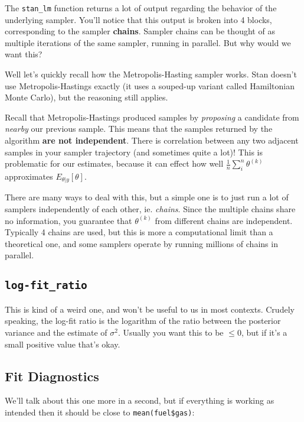 \documentclass[
]{article}
\begin{document}
The \texttt{stan\_lm} function returns a lot of output regarding the
behavior of the underlying sampler. You'll notice that this output is
broken into 4 blocks, corresponding to the sampler \textbf{chains}.
Sampler chains can be thought of as multiple iterations of the same
sampler, running in parallel. But why would we want this?

Well let's quickly recall how the Metropolis-Hasting sampler works. Stan
doesn't use Metropolis-Hastings exactly (it uses a souped-up variant
called Hamiltonian Monte Carlo), but the reasoning still applies.

Recall that Metropolis-Hastings produced samples by \emph{proposing} a
candidate from \emph{nearby} our previous sample. This means that the
samples returned by the algorithm \textbf{are not independent}. There is
correlation between any two adjacent samples in your sampler trajectory
(and sometimes quite a lot)! This is problematic for our estimates,
because it can effect how well \(\frac{1}{n} \sum_i^n \theta^{(k)}\)
approximates \(E_{\theta|y}[\theta]\).

There are many ways to deal with this, but a simple one is to just run a
lot of samplers independently of each other, ie. \emph{chains}. Since
the multiple chains share no information, you guarantee that
\(\theta^{(k)}\) from different chains are independent. Typically 4
chains are used, but this is more a computational limit than a
theoretical one, and some samplers operate by running millions of chains
in parallel.

\hypertarget{log-fit_ratio}{%
\subsection{\texorpdfstring{\texttt{log-fit\_ratio}}{log-fit\_ratio}}\label{log-fit_ratio}}

This is kind of a weird one, and won't be useful to us in most contexts.
Crudely speaking, the log-fit ratio is the logarithm of the ratio
between the posterior variance and the estimate of \(\sigma^2\). Usually
you want this to be \(\leq 0\), but if it's a small positive value
that's okay.

\hypertarget{fit-diagnostics}{%
\subsection{Fit Diagnostics}\label{fit-diagnostics}}

We'll talk about this one more in a second, but if everything is working
as intended then it should be close to \texttt{mean(fuel\$gas)}:
\end{document}
